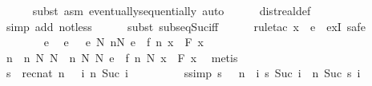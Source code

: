 \documentclass{article}
\theoremstyle{definition}
\begin{document}
\begin{isabellebody}
\ \ \ \ \isamarkupfalse%
\ {\isacharparenleft}subst\ {\isacharparenleft}asm{\isacharparenright}\ eventually{\isacharunderscore}sequentially{\isacharcomma}\ auto{\isacharparenright}\isanewline
\ \ \ \ \isamarkupfalse%
\ dist{\isacharunderscore}real{\isacharunderscore}def\ \isamarkupfalse%
\ {\isacharparenleft}simp\ add{\isacharcolon}\ not{\isacharunderscore}less{\isacharparenright}\isanewline
\ \ \ \ \isamarkupfalse%
\ {\isacharparenleft}subst\ subseq{\isacharunderscore}Suc{\isacharunderscore}iff{\isacharparenright}\isanewline
\ \ \ \ \isamarkupfalse%
\ {\isacharparenleft}rule{\isacharunderscore}tac\ x\ {\isacharequal}\ e\ \ exI{\isacharcomma}\ safe{\isacharparenright}\isanewline
\ \ \ \ \isamarkupfalse%
\ {\isacharminus}\isanewline
\ \ \ \ \ \ \isamarkupfalse%
\ e\ \isamarkupfalse%
\ e{\isacharcolon}\ {\isachardoublequoteopen}{}\ {\isacharless}\ e{\isachardoublequoteclose}\ {\isachardoublequoteopen}{\isasymforall}N{\isachardot}\ {\isasymexists}n{\isasymge}N{\isachardot}\ e\ {\isasymle}\ {\isasymbar}f\ n\ x\ {\isacharminus}\ F\ x{\isasymbar}{\isachardoublequoteclose}\isanewline
\ \ \ \ \ \ \isamarkupfalse%
\ \isamarkupfalse%
\ n\ \ n{\isacharcolon}\ {\isachardoublequoteopen}{\isasymAnd}N{\isachardot}\ N\ {\isasymle}\ n\ N{\isachardoublequoteclose}\ {\isachardoublequoteopen}{\isasymAnd}N{\isachardot}\ e\ {\isasymle}\ {\isasymbar}f\ {\isacharparenleft}n\ N{\isacharparenright}\ x\ {\isacharminus}\ F\ x{\isasymbar}{\isachardoublequoteclose}\ \isamarkupfalse%
\ metis\isanewline
\ \ \ \ \ \ \isamarkupfalse%
\ s\ {\isasymequiv}\ {\isachardoublequoteopen}rec{\isacharunderscore}nat\ {\isacharparenleft}n\ {}{\isacharparenright}\ {\isacharparenleft}{\isasymlambda}{\isacharunderscore}\ i{\isachardot}\ n\ {\isacharparenleft}Suc\ i{\isacharparenright}{\isacharparenright}{\isachardoublequoteclose}\isanewline
\ \ \ \ \ \ \isamarkupfalse%
\ \isamarkupfalse%
\ s{\isacharbrackleft}simp{\isacharbrackright}{\isacharcolon}\ {\isachardoublequoteopen}s\ {}\ {\isacharequal}\ n\ {}{\isachardoublequoteclose}\ {\isachardoublequoteopen}{\isasymAnd}i{\isachardot}\ s\ {\isacharparenleft}Suc\ i{\isacharparenright}\ {\isacharequal}\ n\ {\isacharparenleft}Suc\ {\isacharparenleft}s\ i{\isacharparenright}{\isacharparenright}{\isachardoublequoteclose}\isanewline
\ \ \ \ \ \ \ \ \isamarkupfalse%

\end{isabellebody}
\end{document}
